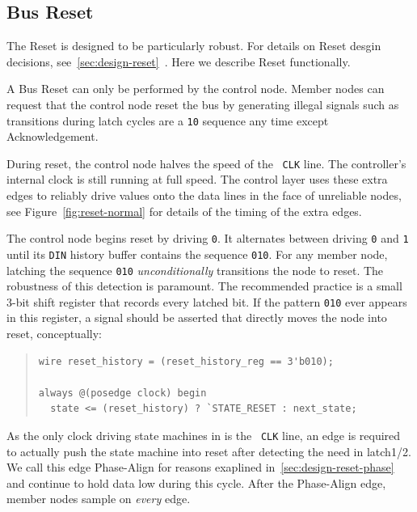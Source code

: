 \subsection{Bus Reset}
\label{sec:protocol-reset}
The \bus Reset is designed to be particularly robust. For details on Reset
desgin decisions, see~\ref{sec:design-reset}~. Here
we describe Reset functionally.

A Bus Reset can only be performed by the control node. Member nodes can
request that the control node reset the bus by generating illegal signals such
as transitions during {\sc latch} cycles are a {\tt 10} sequence any time
except Acknowledgement.

During reset, the control node halves the speed of the \bus~{\tt CLK} line.
The controller's internal clock is still running at full speed. The control
layer uses these extra edges to reliably drive values onto the data lines in
the face of unreliable nodes, see Figure~\ref{fig:reset-normal} for details of
the timing of the extra edges.

The control node begins reset by driving {\tt 0}. It alternates between
driving {\tt 0} and {\tt 1} until its {\tt DIN} history buffer contains the
sequence {\tt 010}. For any member node, latching the sequence {\tt 010} {\em
unconditionally} transitions the node to {\sc reset}. The robustness of this
detection is paramount. The recommended practice is a small 3-bit shift
register that records every latched bit. If the pattern {\tt 010} ever appears
in this register, a signal should be asserted that directly moves the node
into {\sc reset}, conceptually:

\begin{quote}
\begin{lstlisting}
wire reset_history = (reset_history_reg == 3'b010);

always @(posedge clock) begin
  state <= (reset_history) ? `STATE_RESET : next_state;
\end{lstlisting}
\end{quote}

As the only clock driving state machines in \bus is the \bus~{\tt CLK} line,
an edge is required to actually push the state machine into {\sc reset} after
detecting the need in {\sc latch1/2}. We call this edge Phase-Align for reasons
exaplined in~\ref{sec:design-reset-phase}~ and
continue to hold data low during this cycle. After the Phase-Align edge,
member nodes sample on {\em every} edge.

